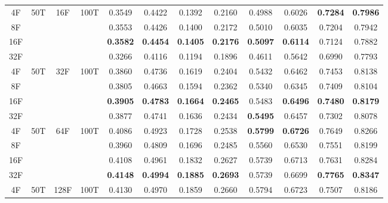 \begin{table}[t]
\begin{tabular}{@{}c@{\hspace{3pt}}c@{\hspace{6pt}}c@{\hspace{3pt}}c@{\hspace{6pt}}*{7}{c@{\hspace{3pt}}}c@{}}
\midrule
4F  & \multirow{4}{*}{50T} & \multirow{4}{*}{16F}  & \multirow{4}{*}{100T} & 0.3549 & 0.4422 & 0.1392 & 0.2160 & 0.4988 & 0.6026 & \textbf{0.7284} & \textbf{0.7986} \\
8F  &                      &                       &                       & 0.3553 & 0.4426 & 0.1400 & 0.2172 & 0.5010 & 0.6035 & 0.7204 & 0.7942 \\
16F &                      &                       &                       & \textbf{0.3582} & \textbf{0.4454} & \textbf{0.1405} & \textbf{0.2176} & \textbf{0.5097} & \textbf{0.6114} & 0.7124 & 0.7882 \\
32F &                      &                       &                       & 0.3266 & 0.4116 & 0.1194 & 0.1896 & 0.4611 & 0.5642 & 0.6990 & 0.7793 \\
\midrule
4F  & \multirow{4}{*}{50T} & \multirow{4}{*}{32F}  & \multirow{4}{*}{100T} & 0.3860 & 0.4736 & 0.1619 & 0.2404 & 0.5432 & 0.6462 & 0.7453 & 0.8138 \\
8F  &                      &                       &                       & 0.3805 & 0.4663 & 0.1594 & 0.2362 & 0.5340 & 0.6345 & 0.7409 & 0.8104 \\
16F &                      &                       &                       & \textbf{0.3905} & \textbf{0.4783} & \textbf{0.1664} & \textbf{0.2465} & 0.5483 & \textbf{0.6496} & \textbf{0.7480} & \textbf{0.8179} \\
32F &                      &                       &                       & 0.3877 & 0.4741 & 0.1636 & 0.2434 & \textbf{0.5495} & 0.6457 & 0.7302 & 0.8078 \\
\midrule
4F  & \multirow{4}{*}{50T} & \multirow{4}{*}{64F}  & \multirow{4}{*}{100T} & 0.4086 & 0.4923 & 0.1728 & 0.2538 & \textbf{0.5799} & \textbf{0.6726} & 0.7649 & 0.8266 \\
8F  &                      &                       &                       & 0.3960 & 0.4809 & 0.1696 & 0.2485 & 0.5560 & 0.6530 & 0.7551 & 0.8199 \\
16F &                      &                       &                       & 0.4108 & 0.4961 & 0.1832 & 0.2627 & 0.5739 & 0.6713 & 0.7631 & 0.8284 \\
32F &                      &                       &                       & \textbf{0.4148} & \textbf{0.4994} & \textbf{0.1885} & \textbf{0.2693} & 0.5739 & 0.6699 & \textbf{0.7765} & \textbf{0.8347} \\
\midrule
4F  & \multirow{4}{*}{50T} & \multirow{4}{*}{128F} & \multirow{4}{*}{100T} & 0.4130 & 0.4970 & 0.1859 & 0.2660 & 0.5794 & 0.6723 & 0.7507 & 0.8186 \\

\end{tabular}
\end{table}
